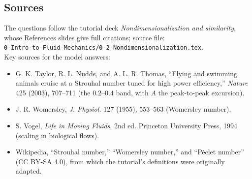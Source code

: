 \documentclass[12pt]{article}
\begin{document}
\subsection*{Sources}
The questions follow the tutorial deck \emph{Nondimensionalization and
similarity}, whose References slides give full citations; source file:\\
{\small\texttt{0-Intro-to-Fluid-Mechanics/0-2-Nondimensionalization.tex}}.\\ Key sources for the model answers:
\begin{itemize}
    \item G. K. Taylor, R. L. Nudds, and A. L. R. Thomas, ``Flying and swimming
          animals cruise at a Strouhal number tuned for high power efficiency,''
          \emph{Nature} 425 (2003), 707--711 (the $0.2$--$0.4$ band, with $A$ the
          peak-to-peak excursion).
    \item J. R. Womersley, \emph{J. Physiol.} 127 (1955), 553--563 (Womersley number).
    \item S. Vogel, \emph{Life in Moving Fluids}, 2nd ed. Princeton University
          Press, 1994 (scaling in biological flows).
    \item Wikipedia, ``Strouhal number,'' ``Womersley number,'' and
          ``P\'eclet number'' (CC BY-SA 4.0), from which the tutorial's
          definitions were originally adapted.
\end{itemize}
\end{document}
